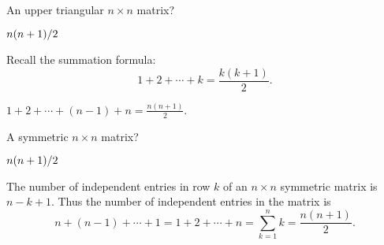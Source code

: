 \documentclass{ximera}
\begin{document}
\begin{exercise}  \label{c1.3.3b}
  An upper triangular $n\times n$ matrix? \begin{prompt}${n(n+1)/2}$\end{prompt}
  \begin{hint}Recall the
    summation formula:
    \[
      1 + 2 + \cdots + k = \frac{k(k+1)}{2}.
    \]
  \end{hint}

\begin{solution}
\soln $1 + 2 + \cdots + (n-1) + n = \frac{n(n + 1)}{2}$.

\end{solution}
\end{exercise}
\begin{exercise}  \label{c1.3.3c}
A symmetric $n\times n$ matrix?   
\begin{prompt}${n(n+1)/2}$\end{prompt}

\begin{solution}
\soln The number of independent entries in row $k$ of an $n\times n$ symmetric matrix is $n-k+1$.  Thus the number of independent entries in the matrix is 
\[
n + (n-1) + \cdots + 1 = 1 + 2 + \cdots + n = \sum_{k=1}^n k = \frac{n(n + 1)}{2}.
\]
\end{solution}
\end{exercise}
\end{document}
